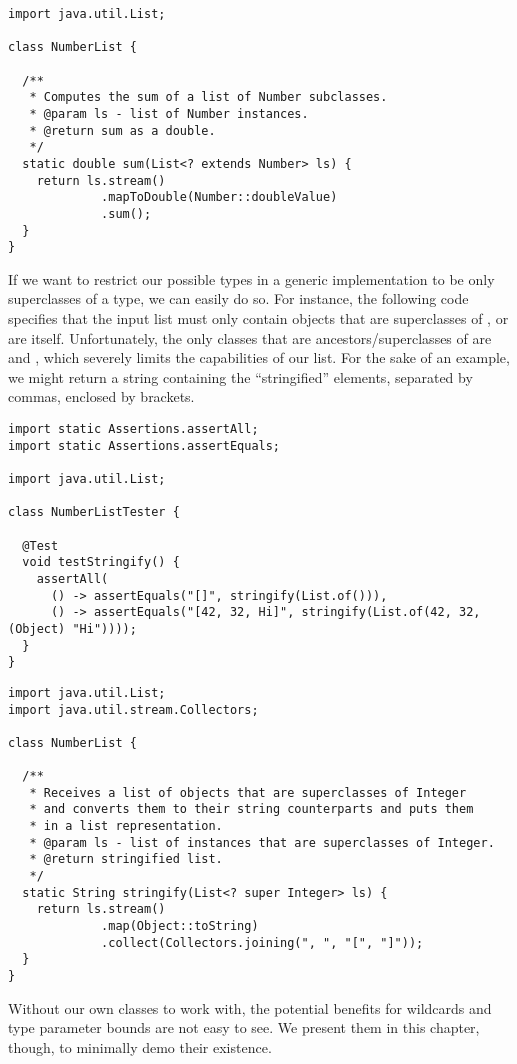 \begin{lstlisting}[language=MyJava]
import java.util.List;

class NumberList {

  /**
   * Computes the sum of a list of Number subclasses.
   * @param ls - list of Number instances.
   * @return sum as a double.
   */
  static double sum(List<? extends Number> ls) {
    return ls.stream()
             .mapToDouble(Number::doubleValue)
             .sum();
  }
}
\end{lstlisting}

If we want to restrict our possible types in a generic implementation to be only superclasses of a type, we can easily do so. 
For instance, the following code specifies that the input list must only contain objects that are superclasses of , or are  itself. 
Unfortunately, the only classes that are ancestors/superclasses of  are  and , which severely limits the capabilities of our list. 
For the sake of an example, we might return a string containing the ``stringified'' elements, separated by commas, enclosed by brackets.

\begin{lstlisting}[language=MyJava]
import static Assertions.assertAll;
import static Assertions.assertEquals;

import java.util.List;

class NumberListTester {

  @Test
  void testStringify() {
    assertAll(
      () -> assertEquals("[]", stringify(List.of())),
      () -> assertEquals("[42, 32, Hi]", stringify(List.of(42, 32, (Object) "Hi"))));
  }
}
\end{lstlisting}

\begin{lstlisting}[language=MyJava]
import java.util.List;
import java.util.stream.Collectors;

class NumberList {

  /**
   * Receives a list of objects that are superclasses of Integer
   * and converts them to their string counterparts and puts them
   * in a list representation.
   * @param ls - list of instances that are superclasses of Integer.
   * @return stringified list.
   */
  static String stringify(List<? super Integer> ls) {
    return ls.stream()
             .map(Object::toString)
             .collect(Collectors.joining(", ", "[", "]"));
  }
}
\end{lstlisting}

Without our own classes to work with, the potential benefits for wildcards and type parameter bounds are not easy to see.
We present them in this chapter, though, to minimally demo their existence.
